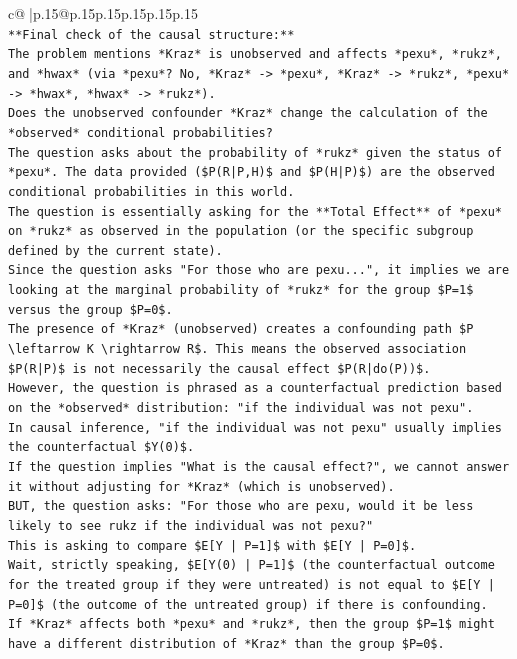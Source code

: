 \documentclass{article}
\begin{document}
{\begin{supertabular}{c@{$\;$}|p{.15\linewidth}@{}p{.15\linewidth}p{.15\linewidth}p{.15\linewidth}p{.15\linewidth}p{.15\linewidth}}
{{{\\ 
\texttt{**Final check of the causal structure:**} \\
\texttt{The problem mentions *Kraz* is unobserved and affects *pexu*, *rukz*, and *hwax* (via *pexu*? No, *Kraz* {-}> *pexu*, *Kraz* {-}> *rukz*, *pexu* {-}> *hwax*, *hwax* {-}> *rukz*).} \\
\texttt{Does the unobserved confounder *Kraz* change the calculation of the *observed* conditional probabilities?} \\
\texttt{The question asks about the probability of *rukz* given the status of *pexu*. The data provided (\$P(R|P,H)\$ and \$P(H|P)\$) are the observed conditional probabilities in this world.} \\
\texttt{The question is essentially asking for the **Total Effect** of *pexu* on *rukz* as observed in the population (or the specific subgroup defined by the current state).} \\
\texttt{Since the question asks "For those who are pexu...", it implies we are looking at the marginal probability of *rukz* for the group \$P=1\$ versus the group \$P=0\$.} \\
\texttt{The presence of *Kraz* (unobserved) creates a confounding path \$P \textbackslash{}leftarrow K \textbackslash{}rightarrow R\$. This means the observed association \$P(R|P)\$ is not necessarily the causal effect \$P(R|do(P))\$.} \\
\texttt{However, the question is phrased as a counterfactual prediction based on the *observed* distribution: "if the individual was not pexu".} \\
\texttt{In causal inference, "if the individual was not pexu" usually implies the counterfactual \$Y(0)\$.} \\
\texttt{If the question implies "What is the causal effect?", we cannot answer it without adjusting for *Kraz* (which is unobserved).} \\
\texttt{BUT, the question asks: "For those who are pexu, would it be less likely to see rukz if the individual was not pexu?"} \\
\texttt{This is asking to compare \$E{[}Y | P=1{]}\$ with \$E{[}Y | P=0{]}\$.} \\
\texttt{Wait, strictly speaking, \$E{[}Y(0) | P=1{]}\$ (the counterfactual outcome for the treated group if they were untreated) is not equal to \$E{[}Y | P=0{]}\$ (the outcome of the untreated group) if there is confounding.} \\
\texttt{If *Kraz* affects both *pexu* and *rukz*, then the group \$P=1\$ might have a different distribution of *Kraz* than the group \$P=0\$.} \\
}}}
\end{supertabular}}
\end{document}
